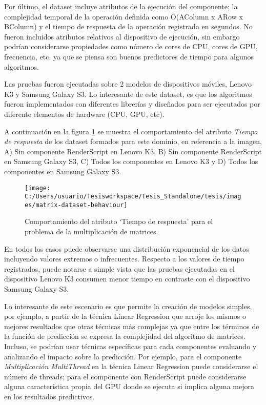 Por último, el dataset incluye atributos de la ejecución del componente;
la complejidad temporal de la operación definida como O(AColumn x
ARow x BColumn) y el tiempo de respuesta de la operación registrada
en segundos. No fueron incluidos atributos relativos al dispositivo
de ejecución, sin embargo podrían considerarse propiedades como número
de cores de \ac{CPU}, cores de \ac{GPU}, frecuencia, etc. ya que
se piensa son buenos predictores de tiempo para algunos algoritmos. 

Las pruebas fueron ejecutadas sobre 2 modelos de dispositivos móviles,
Lenovo K3 y Samsung Galaxy S3. Lo interesante de este dataset, es
que los algoritmos fueron implementados con diferentes librerías y
diseñados para ser ejecutados por diferente elementos de hardware
(\ac{CPU}, \ac{GPU}, etc). 

A continuación en la figura \ref{fig:matrix-dataset-behaviour} se
muestra el comportamiento del atributo \emph{Tiempo de respuesta}
de los dataset formados para este dominio, en referencia a la imagen,
A) Sin componente RenderScript en Lenovo K3, B) Sin componente RenderScript
en Samsung Galaxy S3, C) Todos los componentes en Lenovo K3 y D) Todos
los componentes en Samsung Galaxy S3.

\begin{figure}[H]
\begin{centering}
\texttt{[image: C:/Users/usuario/Tesisworkspace/Tesis\_Standalone/tesis/images/matrix-dataset-behaviour]}
\par\end{centering}

\caption{Comportamiento del atributo ‘Tiempo de respuesta’ para el problema
de la multiplicación de matrices.\label{fig:matrix-dataset-behaviour}}
\end{figure}


En todos los casos puede observarse una distribución exponencial de
los datos incluyendo valores extremos o infrecuentes. Respecto a los
valores de tiempo registrados, puede notarse a simple vista que las
pruebas ejecutadas en el dispositivo Lenovo K3 consumen menor tiempo
en contraste con el dispositivo Samsung Galaxy S3. 

Lo interesante de este escenario es que permite la creación de modelos
simples, por ejemplo, a partir de la técnica Linear Regression que
arroje los mismos o mejores resultados que otras técnicas más complejas
ya que entre los términos de la función de predicción se expresa la
complejidad del algoritmo de matrices. Incluso, se podrían usar técnicas
específicas para cada componentes evaluando y analizando el impacto
sobre la predicción. Por ejemplo, para el componente \emph{Multiplicación
MultiThread} en la técnica Linear Regression puede considerarse el
número de threads; para el componente con RenderScript puede considerarse
alguna característica propia del \ac{GPU} donde se ejecuta si implica
alguna mejora en los resultados predictivos. 


